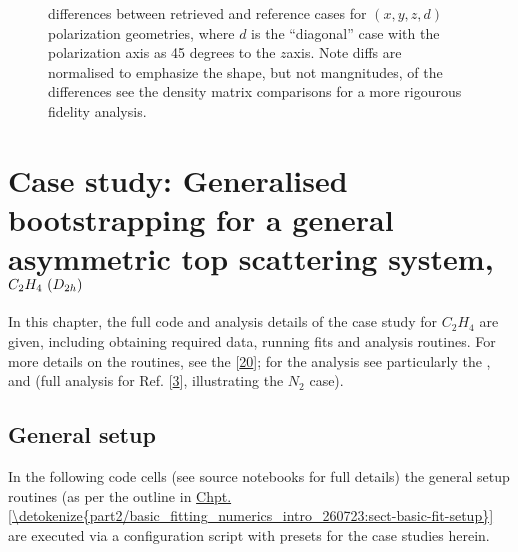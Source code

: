 \documentclass[letterpaper,table,10pt,english]{jupyterBook}
\begin{document}
\begin{figure}[htbp]
\centering
\capstart

\noindent{}
\caption{{\hyperref[\detokenize{backmatter/glossary:term-MF}]{}} differences between retrieved and reference cases for \((x,y,z,d)\) polarization geometries, where \(d\) is the “diagonal” case with the polarization axis as 45 degrees to the \(z\)\sphinxhyphen{}axis. Note diffs are normalised to emphasize the shape, but not mangnitudes, of the differences \sphinxhyphen{} see the density matrix comparisons for a more rigourous fidelity analysis.}\label{\detokenize{part2/case-study-OCS_290723:fig-ocs-diff}}\end{figure}

\sphinxstepscope


\chapter{Case study: Generalised bootstrapping for a general asymmetric top scattering system, \protect\(C_2H_4~(D_{2h})\protect\)}
\label{\detokenize{part2/case-study-C2H4_290723:case-study-generalised-bootstrapping-for-a-general-asymmetric-top-scattering-system-c-2h-4-d-2h}}\label{\detokenize{part2/case-study-C2H4_290723:chpt-c2h4-case-study}}\label{\detokenize{part2/case-study-C2H4_290723::doc}}
\sphinxAtStartPar
In this chapter, the full code and analysis details of the case study for \(C_2H_4\) are given, including obtaining required data, running fits and analysis routines. For more details on the routines, see the  {[}\hyperlink{cite.backmatter/bibliography:id681}{20}{]}; for the analysis see particularly the , and  (full analysis for Ref. {[}\hyperlink{cite.backmatter/bibliography:id686}{3}{]}, illustrating the \(N_2\) case).


\section{General setup}
\label{\detokenize{part2/case-study-C2H4_290723:general-setup}}
\sphinxAtStartPar
In the following code cells (see source notebooks for full details) the general setup routines (as per the outline in \hyperref[\detokenize{part2/basic_fitting_numerics_intro_260723:sect-basic-fit-setup}]{Chpt.\@ \ref{\detokenize{part2/basic_fitting_numerics_intro_260723:sect-basic-fit-setup}}} are executed via a configuration script with presets for the case studies herein.
\end{document}
